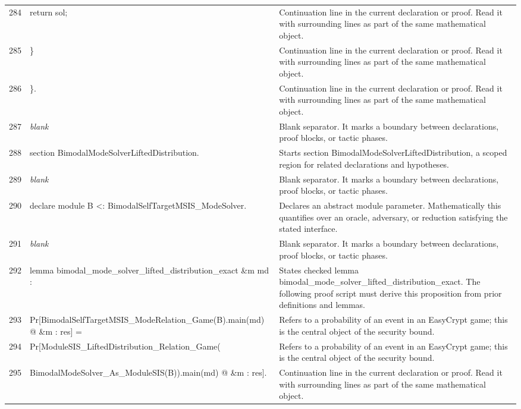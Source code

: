 \documentclass[10pt]{article}
\begin{document}
\begin{longtable}{r L{0.53\textwidth} L{0.37\textwidth}}
284 & {\ttfamily\scriptsize     return sol;} & Continuation line in the current declaration or proof.  Read it with surrounding lines as part of the same mathematical object. \\
285 & {\ttfamily\scriptsize   \}} & Continuation line in the current declaration or proof.  Read it with surrounding lines as part of the same mathematical object. \\
286 & {\ttfamily\scriptsize \}.} & Continuation line in the current declaration or proof.  Read it with surrounding lines as part of the same mathematical object. \\
287 & {\ttfamily\scriptsize \emph{blank}} & Blank separator.  It marks a boundary between declarations, proof blocks, or tactic phases. \\
288 & {\ttfamily\scriptsize section BimodalModeSolverLiftedDistribution.} & Starts section BimodalModeSolverLiftedDistribution, a scoped region for related declarations and hypotheses. \\
289 & {\ttfamily\scriptsize \emph{blank}} & Blank separator.  It marks a boundary between declarations, proof blocks, or tactic phases. \\
290 & {\ttfamily\scriptsize declare module B <: BimodalSelfTargetMSIS\_ModeSolver.} & Declares an abstract module parameter.  Mathematically this quantifies over an oracle, adversary, or reduction satisfying the stated interface. \\
291 & {\ttfamily\scriptsize \emph{blank}} & Blank separator.  It marks a boundary between declarations, proof blocks, or tactic phases. \\
292 & {\ttfamily\scriptsize lemma bimodal\_mode\_solver\_lifted\_distribution\_exact \&m md :} & States checked lemma bimodal\_mode\_solver\_lifted\_distribution\_exact.  The following proof script must derive this proposition from prior definitions and lemmas. \\
293 & {\ttfamily\scriptsize   Pr[BimodalSelfTargetMSIS\_ModeRelation\_Game(B).main(md) @ \&m : res] =} & Refers to a probability of an event in an EasyCrypt game; this is the central object of the security bound. \\
294 & {\ttfamily\scriptsize   Pr[ModuleSIS\_LiftedDistribution\_Relation\_Game(} & Refers to a probability of an event in an EasyCrypt game; this is the central object of the security bound. \\
295 & {\ttfamily\scriptsize        BimodalModeSolver\_As\_ModuleSIS(B)).main(md) @ \&m : res].} & Continuation line in the current declaration or proof.  Read it with surrounding lines as part of the same mathematical object. \\

\end{longtable}
\end{document}

